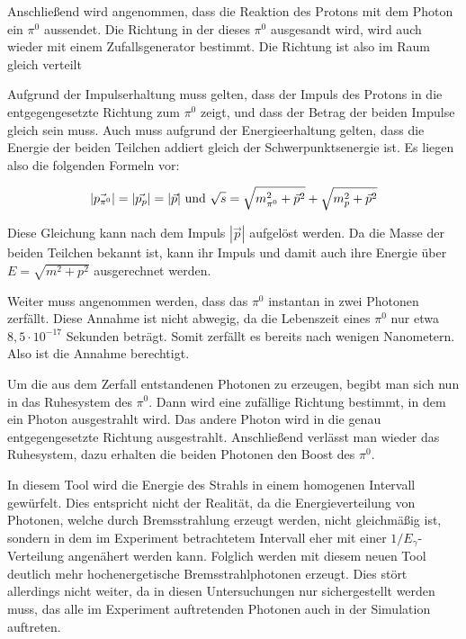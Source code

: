 \documentclass[a4paper,11pt,oneside,final,german,openbib,pdftex]{scrbook}
\begin{document}
{Anschlie{\ss}end wird angenommen, dass die Reaktion des Protons mit dem Photon ein $\pi^0$ aussendet. Die Richtung in der dieses $\pi^0$ ausgesandt wird, wird auch wieder mit einem Zufallsgenerator bestimmt. Die Richtung ist also im Raum gleich verteilt

Aufgrund der Impulserhaltung muss gelten, dass der Impuls des Protons in die entgegengesetzte Richtung zum $\pi^0$ zeigt, und dass der Betrag der beiden Impulse gleich sein muss. Auch muss aufgrund der Energieerhaltung gelten, dass die Energie der beiden Teilchen addiert gleich der Schwerpunktsenergie ist. Es liegen also die folgenden Formeln vor:


\begin{equation}
|\vec{p_{\pi^0}}|=|\vec{p_p}| = |\vec{p}| \textnormal{  und  } \sqrt{s}=\sqrt{m_{\pi^0}^2+\vec{p}^2} + \sqrt{m_{p}^2+\vec{p}^2}
\end{equation}


Diese Gleichung kann nach dem Impuls $|\vec{p}|$ aufgel\"ost werden. Da die Masse der beiden Teilchen bekannt ist, kann ihr Impuls und damit auch ihre Energie über $E=\sqrt{m^2+p^2}$ ausgerechnet werden. 

Weiter muss angenommen werden, dass das $\pi^0$ instantan in zwei Photonen zerf\"allt. Diese Annahme ist nicht abwegig, da die Lebenszeit eines $\pi^0$ nur etwa $8,5\cdot10^{-17}$ Sekunden betr\"agt. Somit zerf\"allt es bereits nach wenigen Nanometern. Also ist die Annahme berechtigt.

Um die aus dem Zerfall entstandenen Photonen zu erzeugen, begibt man sich nun in das Ruhesystem des $\pi^0$. Dann wird eine zuf\"allige Richtung bestimmt, in dem ein Photon ausgestrahlt wird. Das andere Photon wird in die genau entgegengesetzte Richtung ausgestrahlt. Anschlie{\ss}end verl\"asst man wieder das Ruhesystem, dazu erhalten die beiden Photonen den Boost des $\pi^0$. 
\newline


In diesem Tool wird die Energie des Strahls in einem homogenen Intervall gew\"urfelt. Dies entspricht nicht der Realit\"at, da die Energieverteilung von Photonen, welche durch Bremsstrahlung erzeugt werden, nicht gleichm\"a{\ss}ig ist, sondern in dem im Experiment betrachtetem Intervall eher mit einer $1/E_{\gamma}$-Verteilung angen\"ahert werden kann. Folglich werden mit diesem neuen Tool deutlich mehr hochenergetische Bremsstrahlphotonen erzeugt. Dies st\"ort allerdings nicht weiter, da in diesen Untersuchungen nur sichergestellt werden muss, das alle im Experiment auftretenden Photonen auch in der Simulation auftreten.

}
\end{document}
